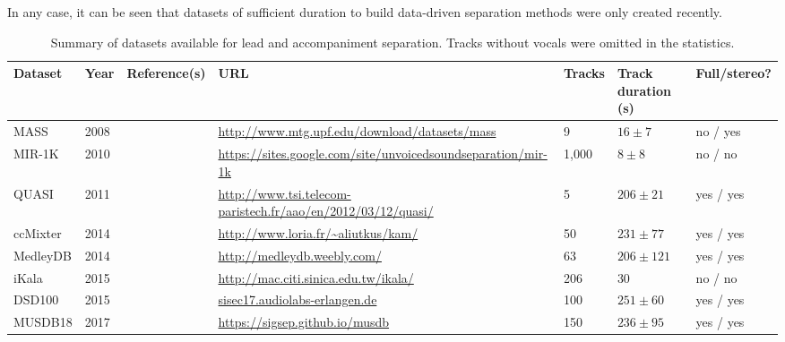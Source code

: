 In any case, it can be seen that datasets of sufficient duration to build data-driven separation methods were only created recently.

\begin{table*}[htbp]
	\centering
	\caption{Summary of datasets available for lead and accompaniment separation. Tracks without vocals were omitted in the statistics.}
	\label{tab:datasets}
		\begin{tabular}{|l l l l l l l|}
			\hline
			\textbf{Dataset} & \textbf{Year} & \textbf{Reference(s)} & \textbf{URL} & \textbf{Tracks} & \textbf{Track duration (s)} & \textbf{Full/stereo?}\\
			\hline
			MASS & 2008 & \cite{MTGMASSdb} & \url{http://www.mtg.upf.edu/download/datasets/mass} & 9 & $16 \pm 7$ & no / yes \\
			MIR-1K & 2010 & \cite{hsu10} & \url{https://sites.google.com/site/unvoicedsoundseparation/mir-1k} & 1,000 & $8 \pm 8$ & no / no \\
			QUASI & 2011 & \cite{liutkus11,vincent12} & \url{http://www.tsi.telecom-paristech.fr/aao/en/2012/03/12/quasi/} & 5 & $206 \pm 21$ & yes / yes \\
			ccMixter & 2014 & \cite{liutkus142} & \url{http://www.loria.fr/~aliutkus/kam/} & 50 & $231 \pm 77 $ & yes / yes \\
			MedleyDB & 2014 & \cite{bittner14} & \url{http://medleydb.weebly.com/} & 63 & $206 \pm 121$ & yes / yes \\
			iKala & 2015 & \cite{chan15} & \url{http://mac.citi.sinica.edu.tw/ikala/} & 206 & 30 & no / no \\
			DSD100 & 2015 & \cite{ono15} & \url{sisec17.audiolabs-erlangen.de} & 100 & $251 \pm 60$ & yes / yes \\
      MUSDB18 & 2017 & \cite{rafii17} & \url{https://sigsep.github.io/musdb} & 150 & $236 \pm 95$ & yes / yes \\
			\hline
		\end{tabular}
\end{table*}

